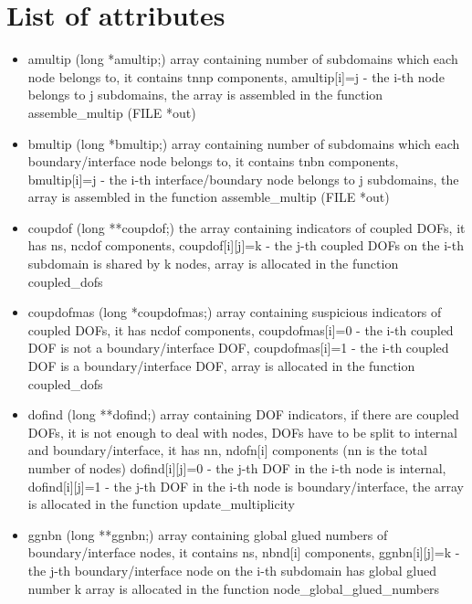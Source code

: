 \section{List of attributes}
\begin{itemize}
\item
{\sf amultip (long *amultip;)} array containing number of subdomains which each node belongs to,
it contains {\sf tnnp} components,
{\sf amultip[i]=j} - the i-th node belongs to j subdomains,
the array is assembled in the function {\sf assemble\_multip (FILE *out)}

\item
{\sf bmultip (long *bmultip;)} array containing number of subdomains which each boundary/interface node belongs to, it contains {\sf tnbn} components,
{\sf bmultip[i]=j} - the i-th interface/boundary node belongs to j subdomains,
the array is assembled in the function {\sf assemble\_multip (FILE *out)}

\item
{\sf coupdof (long **coupdof;)} the array containing indicators of coupled DOFs,
it has {\sf ns, ncdof} components,
{\sf coupdof[i][j]=k} - the j-th coupled DOFs on the i-th subdomain is shared by k nodes,
array is allocated in the function {\sf coupled\_dofs}

\item
{\sf coupdofmas (long *coupdofmas;)} array containing suspicious indicators of coupled DOFs,
it has {\sf ncdof} components,
{\sf coupdofmas[i]=0} - the i-th coupled DOF is not a boundary/interface DOF,
{\sf coupdofmas[i]=1} - the i-th coupled DOF is a boundary/interface DOF,
array is allocated in the function {\sf coupled\_dofs}

\item
{\sf dofind (long **dofind;)} array containing DOF indicators,
if there are coupled DOFs, it is not enough to deal with nodes,
DOFs have to be split to internal and boundary/interface,
it has {\sf nn, ndofn[i]} components ({\sf nn} is the total number of nodes)
{\sf dofind[i][j]=0} - the j-th DOF in the i-th node is internal,
{\sf dofind[i][j]=1} - the j-th DOF in the i-th node is boundary/interface,
the array is allocated in the function {\sf update\_multiplicity}


\item
{\sf ggnbn (long **ggnbn;)} array containing global glued numbers of boundary/interface nodes,
it contains {\sf ns, nbnd[i]} components,
{\sf ggnbn[i][j]=k} - the j-th boundary/interface node on the i-th subdomain has global glued number k
array is allocated in the function {\sf node\_global\_glued\_numbers}


\end{itemize}
